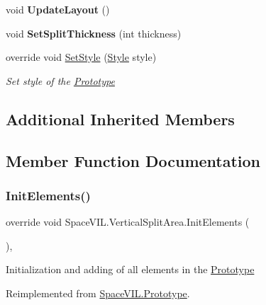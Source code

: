 \begin{DoxyCompactItemize}
void {\bfseries Update\+Layout} ()
\item 
\mbox{\label{class_space_v_i_l_1_1_vertical_split_area_a4329afee056a1f162c92bff8fa7e1e8f}} 
void {\bfseries Set\+Split\+Thickness} (int thickness)
\item 
override void \mbox{\hyperlink{class_space_v_i_l_1_1_vertical_split_area_a5911fe0a1fb51f9e14a4f3f31dac4ecd}{Set\+Style}} (\mbox{\hyperlink{class_space_v_i_l_1_1_decorations_1_1_style}{Style}} style)
\begin{DoxyCompactList}\small\item\em Set style of the \mbox{\hyperlink{class_space_v_i_l_1_1_prototype}{Prototype}} \end{DoxyCompactList}\end{DoxyCompactItemize}
\subsection*{Additional Inherited Members}


\subsection{Member Function Documentation}
\mbox{\label{class_space_v_i_l_1_1_vertical_split_area_ac00bf6f3d89b83dadcdd05f6e95b97d8}} 
\subsubsection{\texorpdfstring{Init\+Elements()}{InitElements()}}
{\footnotesize\ttfamily override void Space\+V\+I\+L.\+Vertical\+Split\+Area.\+Init\+Elements (\begin{DoxyParamCaption}{ }\end{DoxyParamCaption})\hspace{0.3cm}{\ttfamily [inline]}, {\ttfamily [virtual]}}



Initialization and adding of all elements in the \mbox{\hyperlink{class_space_v_i_l_1_1_prototype}{Prototype}} 



Reimplemented from \mbox{\hyperlink{class_space_v_i_l_1_1_prototype_ac3379fe02923ee155b5b0084abf27420}{Space\+V\+I\+L.\+Prototype}}.

